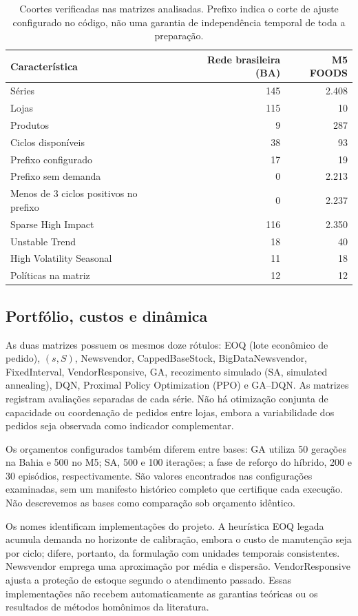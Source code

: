 \documentclass[preprint,12pt]{elsarticle}
\begin{document}
\begin{table}[htbp]
\centering\small
\caption{Coortes verificadas nas matrizes analisadas. Prefixo indica o corte de ajuste configurado no código, não uma garantia de independência temporal de toda a preparação.}\label{tab:cohort}
\begin{tabular}{lrr}
\toprule
Característica & Rede brasileira (BA) & M5 FOODS\\
\midrule
Séries & 145 & 2.408\\
Lojas & 115 & 10\\
Produtos & 9 & 287\\
Ciclos disponíveis & 38 & 93\\
Prefixo configurado & 17 & 19\\
Prefixo sem demanda & 0 & 2.213\\
Menos de 3 ciclos positivos no prefixo & 0 & 2.237\\
Sparse High Impact & 116 & 2.350\\
Unstable Trend & 18 & 40\\
High Volatility Seasonal & 11 & 18\\
Políticas na matriz & 12 & 12\\
\bottomrule
\end{tabular}
\end{table}

\subsection{Portfólio, custos e dinâmica}
As duas matrizes possuem os mesmos doze rótulos: EOQ (lote econômico de pedido), $(s,S)$, Newsvendor, CappedBaseStock, BigDataNewsvendor, FixedInterval, VendorResponsive, GA, recozimento simulado (SA, simulated annealing), DQN, Proximal Policy Optimization (PPO) e GA--DQN. As matrizes registram avaliações separadas de cada série. Não há otimização conjunta de capacidade ou coordenação de pedidos entre lojas, embora a variabilidade dos pedidos seja observada como indicador complementar.

Os orçamentos configurados também diferem entre bases: GA utiliza 50 gerações na Bahia e 500 no M5; SA, 500 e 100 iterações; a fase de reforço do híbrido, 200 e 30 episódios, respectivamente. São valores encontrados nas configurações examinadas, sem um manifesto histórico completo que certifique cada execução. Não descrevemos as bases como comparação sob orçamento idêntico.

Os nomes identificam implementações do projeto. A heurística EOQ legada acumula demanda no horizonte de calibração, embora o custo de manutenção seja por ciclo; difere, portanto, da formulação com unidades temporais consistentes. Newsvendor emprega uma aproximação por média e dispersão. VendorResponsive ajusta a proteção de estoque segundo o atendimento passado. Essas implementações não recebem automaticamente as garantias teóricas ou os resultados de métodos homônimos da literatura.
\end{document}
